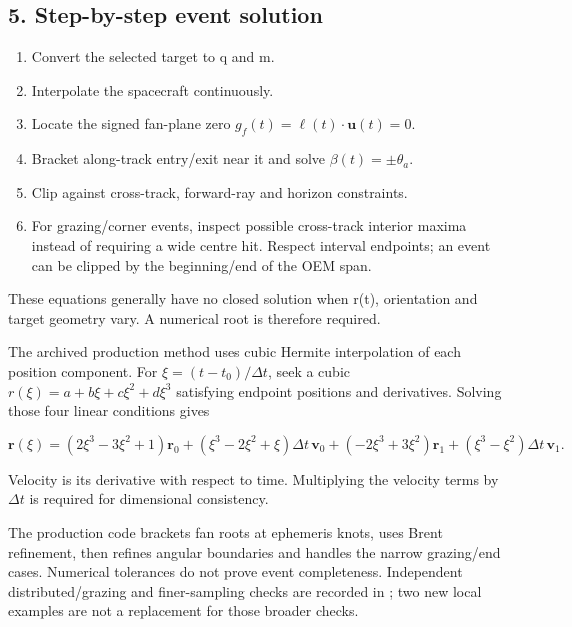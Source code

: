 \documentclass[10pt,a4paper]{article}
\numberwithin{equation}{section}
\begin{document}
\subsection*{5. Step-by-step event solution}

\begin{enumerate}
\item Convert the selected target to q and m.
\item Interpolate the spacecraft continuously.
\item Locate the signed fan-plane zero \(g_f(t)=\boldsymbol\ell(t)\cdot\mathbf u(t)=0\).
\item Bracket along-track entry/exit near it and solve \(\beta(t)=\pm\theta_a\).
\item Clip against cross-track, forward-ray and horizon constraints.
\item For grazing/corner events, inspect possible cross-track interior maxima instead of requiring a wide centre hit. Respect interval endpoints; an event can be clipped by the beginning/end of the OEM span.
\end{enumerate}

\begin{sloppypar}These equations generally have no closed solution when r(t), orientation and target geometry vary. A numerical root is therefore required.\end{sloppypar}


\begin{sloppypar}The archived production method uses cubic Hermite interpolation of each position component. For \(\xi=(t-t_0)/\Delta t\), seek a cubic \(r(\xi)=a+b\xi+c\xi^2+d\xi^3\) satisfying endpoint positions and derivatives. Solving those four linear conditions gives\end{sloppypar}


\begin{equation}\mathbf r(\xi)=
(2\xi^3-3\xi^2+1)\mathbf r_0+
(\xi^3-2\xi^2+\xi)\Delta t\,\mathbf v_0+
(-2\xi^3+3\xi^2)\mathbf r_1+
(\xi^3-\xi^2)\Delta t\,\mathbf v_1.\label{eq:ch7-10}\end{equation}

\begin{sloppypar}Velocity is its derivative with respect to time. Multiplying the velocity terms by \(\Delta t\) is required for dimensional consistency.\end{sloppypar}


\begin{sloppypar}The production code brackets fan roots at ephemeris knots, uses Brent refinement, then refines angular boundaries and handles the narrow grazing/end cases. Numerical tolerances do not prove event completeness. Independent distributed/grazing and finer-sampling checks are recorded in \cite{S10}; two new local examples are not a replacement for those broader checks.\end{sloppypar}
\end{document}
